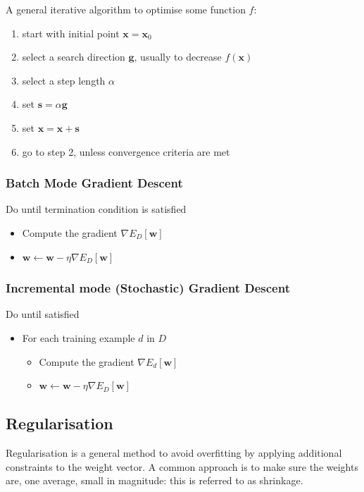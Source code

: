 A general iterative algorithm to optimise some function \(f\):
\begin{enumerate}
    \item start with initial point \(\mathbf{x} = \mathbf{x}_0\)
    \item select a search direction \(\mathbf{g}\), usually to decrease \(f(\mathbf{x})\)
    \item select a step length \(\alpha\)
    \item set \(\mathbf{s} = \alpha\mathbf{g}\)
    \item set \(\mathbf{x} = \mathbf{x} + \mathbf{s}\)
    \item go to step 2, unless convergence criteria are met
\end{enumerate}

\subsubsection{Batch Mode Gradient Descent}

Do until termination condition is satisfied
\begin{itemize}
    \item Compute the gradient \(\nabla E_D[\mathbf{w}]\)
    \item \(\mathbf{w} \leftarrow \mathbf{w} - \eta \nabla E_D[\mathbf{w}]\)
\end{itemize}

\subsubsection{Incremental mode (Stochastic) Gradient Descent}

Do until satisfied
\begin{itemize}
    \item For each training example \(d\) in \(D\)
    \begin{itemize}
        \item Compute the gradient \(\nabla E_d[\mathbf{w}]\)
        \item \(\mathbf{w} \leftarrow \mathbf{w} - \eta \nabla E_D[\mathbf{w}]\)
    \end{itemize}
\end{itemize}

\subsection{Regularisation}

Regularisation is a general method to avoid overfitting by applying additional constraints to the weight vector. A common approach is to make sure the weights are, one average, small in magnitude: this is referred to as shrinkage.

